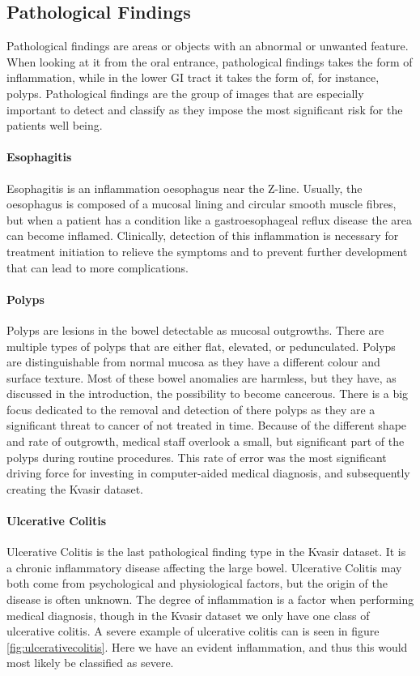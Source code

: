 \subsection{Pathological Findings}
Pathological findings are areas or objects with an abnormal or unwanted feature. When looking at it from the oral entrance, pathological findings takes the form of inflammation, while in the lower GI tract it takes the form of, for instance, polyps. 
Pathological findings are the group of images that are especially important to detect and classify as they impose the most significant risk for the patients well being. 


\paragraph{Esophagitis}
Esophagitis is an inflammation oesophagus near the Z-line. Usually, the oesophagus is composed of a mucosal lining and circular smooth muscle fibres, but when a patient has a condition like a gastroesophageal reflux disease the area can become inflamed. 
Clinically, detection of this inflammation is necessary for treatment initiation to relieve the symptoms and to prevent further development that can lead to more complications.


\paragraph{Polyps}
Polyps are lesions in the bowel detectable as mucosal outgrowths. There are multiple types of polyps that are either flat, elevated, or pedunculated. Polyps are distinguishable from normal mucosa as they have a different colour and surface texture. Most of these bowel anomalies are harmless, but they have, as discussed in the introduction, the possibility to become cancerous. 
There is a big focus dedicated to the removal and detection of there polyps as they are a significant threat to cancer of not treated in time. Because of the different shape and rate of outgrowth, medical staff overlook a small, but significant part of the polyps during routine procedures. 
This rate of error was the most significant driving force for investing in computer-aided medical diagnosis, and subsequently creating the Kvasir dataset.

\paragraph{Ulcerative Colitis}
Ulcerative Colitis is the last pathological finding type in the Kvasir dataset. 
It is a chronic inflammatory disease affecting the large bowel. Ulcerative Colitis may both come from psychological and physiological factors, but the origin of the disease is often unknown. The degree of inflammation is a factor when performing medical diagnosis, though in the Kvasir dataset we only have one class of ulcerative colitis.
A severe example of ulcerative colitis can is seen in figure \ref{fig:ulcerativecolitis}. Here we have an evident inflammation, and thus this would most likely be classified as severe.



